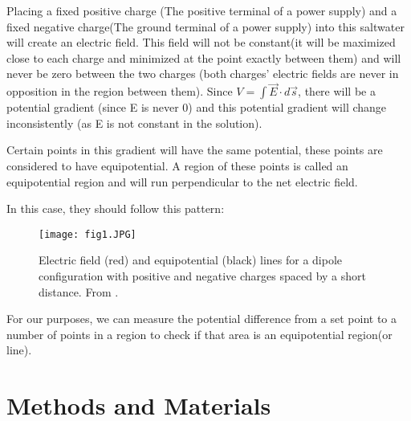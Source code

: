 ﻿\documentclass[10pt,journal,twoside]{IEEEtran}
\begin{document}
Placing a fixed positive charge (The positive terminal of a power supply) and a fixed negative charge(The ground terminal of a power supply) into this saltwater will create an electric field. This field will not be constant(it will be maximized close to each charge and minimized at the point exactly between them) and will never be zero between the two charges (both charges' electric fields are never in opposition in the region between them). Since $V=\int\vec{E}\cdot d\vec{s}$, there will be a potential gradient (since E is never 0) and this potential gradient will change inconsistently (as E is not constant in the solution). 

Certain points in this gradient will have the same potential, these points are considered to have equipotential. A region of these points is called an equipotential region and will run perpendicular to the net electric field. 

In this case, they should follow this pattern:
\begin{figure}
\begin{center}
\texttt{[image: fig1.JPG]}
\end{center}
\caption{Electric field (red) and equipotential (black) lines for a dipole configuration with positive and negative charges spaced by a short distance. From \cite{libre}.}
\label{fig:1}
\end{figure}

For our purposes, we can measure the potential difference from a set point to a number of points in a region to check if that area is an equipotential region(or line).










\section{Methods and Materials}
\end{document}
